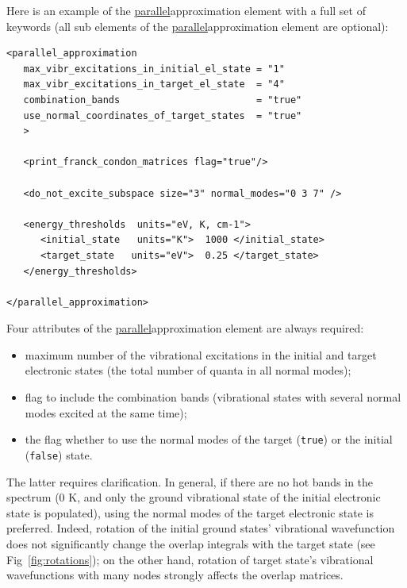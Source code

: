 \documentclass[11pt]{article}
\begin{document}
Here is an example of the \ul{parallel}{approximation} element with a full
set of keywords (all sub elements of the \ul{parallel}{approximation} element are optional):
\begin{lstlisting}[frame=single,framerule=0pt]
<parallel_approximation
   max_vibr_excitations_in_initial_el_state = "1"
   max_vibr_excitations_in_target_el_state  = "4"
   combination_bands                        = "true"
   use_normal_coordinates_of_target_states  = "true"
   >

   <print_franck_condon_matrices flag="true"/>

   <do_not_excite_subspace size="3" normal_modes="0 3 7" />

   <energy_thresholds  units="eV, K, cm-1">
      <initial_state   units="K">  1000 </initial_state>
      <target_state   units="eV">  0.25 </target_state>
   </energy_thresholds>

</parallel_approximation>
\end{lstlisting}
Four attributes of the \ul{parallel}{approximation} element are always required:
\begin{itemize}
\item maximum number of the vibrational excitations in the initial and target electronic states
(the total number of quanta in all normal modes);
\item flag to include the combination bands (vibrational states with several normal modes excited at the same time);
\item the flag whether to use the normal modes of the target ({\tt true}) or the initial ({\tt false}) state.
\end{itemize}
The latter requires clarification. In general, if there are no hot bands in the spectrum 
(0 K, and only the ground vibrational state of the initial electronic state is populated),
using the normal modes of the target electronic state is preferred. 
Indeed, rotation of
the initial ground states' vibrational wavefunction does not significantly change the overlap integrals with
the target state (see Fig~\ref{fig:rotations}); on the other hand, rotation of target state's vibrational wavefunctions with many 
nodes strongly affects the overlap matrices.
\end{document}
